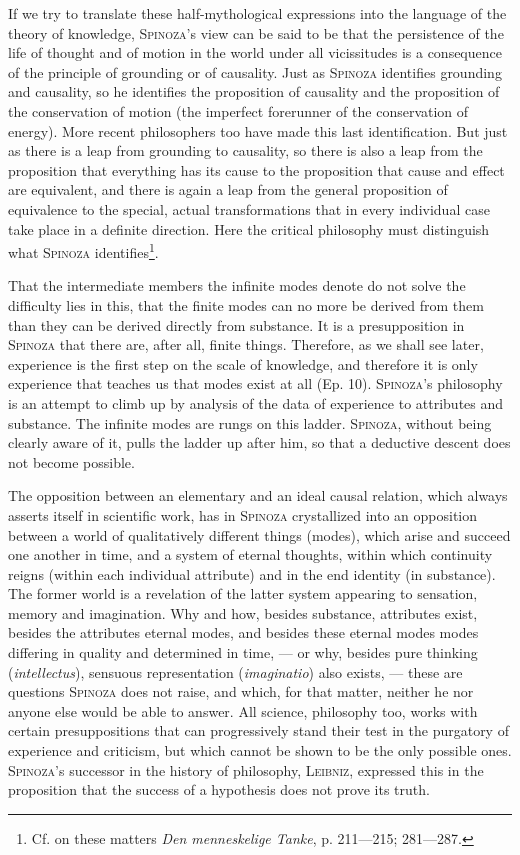 \documentclass[12pt]{article}
\newcommand{\opage}[1]{\marginnote{\footnotesize\textit{[#1]}}}
\begin{document}
If we try to translate these half-mythological expressions into the language of the
theory of knowledge, \textsc{Spinoza}'s view can be said to be that the persistence of
the life of thought and of motion in the world under all vicissitudes is a consequence of
the principle of grounding or of causality. Just as \textsc{Spinoza} identifies grounding
and causality, so he identifies the proposition of causality and the proposition of the
conservation of motion (the imperfect forerunner of the conservation of energy). More
recent philosophers too have made this last identification. But just as there is a leap
from grounding to causality, so there is also a leap from the proposition that
everything has its cause to the proposition that cause and effect are equivalent, and
there is again a leap from the general proposition of equivalence to the special, actual
transformations that in every individual case take place in a definite direction. Here
the critical philosophy must distinguish what \textsc{Spinoza} identifies\footnote{Cf.
on these matters \textit{Den menneskelige Tanke}, p. 211---215; 281---287.}.

That the intermediate members the infinite modes denote do not solve the difficulty lies
in this, that the finite modes can no more be derived from them than they can be derived
directly from substance. It is a presupposition in \textsc{Spinoza} that there are,
after all, finite things. Therefore, as we shall see later, experience is the first step
on \opage{28}the scale of knowledge, and therefore it is only experience that teaches us
that modes exist at all (Ep. 10). \textsc{Spinoza}'s philosophy is an attempt to climb up
by analysis of the data of experience to attributes and substance. The infinite modes are
rungs on this ladder. \textsc{Spinoza}, without being clearly aware of it, pulls the
ladder up after him, so that a deductive descent does not become possible.

The opposition between an elementary and an ideal causal relation, which always asserts
itself in scientific work, has in \textsc{Spinoza} crystallized into an opposition
between a world of qualitatively different things (modes), which arise and succeed one
another in time, and a system of eternal thoughts, within which continuity reigns (within
each individual attribute) and in the end identity (in substance). The former world is a
revelation of the latter system appearing to sensation, memory and imagination. Why and
how, besides substance, attributes exist, besides the attributes eternal modes, and
besides these eternal modes modes differing in quality and determined in time, --- or why,
besides pure thinking (\textit{intellectus}), sensuous representation
(\textit{imaginatio}) also exists, --- these are questions \textsc{Spinoza} does not
raise, and which, for that matter, neither he nor anyone else would be able to answer.
All science, philosophy too, works with certain presuppositions that can progressively
stand their test in the purgatory of experience and criticism, but which cannot be shown
to be the only possible ones. \textsc{Spinoza}'s successor in the history of philosophy,
\textsc{Leibniz}, expressed this in the proposition that the success of a hypothesis
does not prove its truth.
\end{document}
